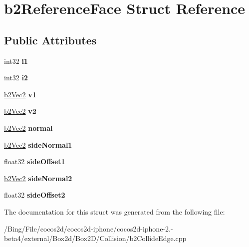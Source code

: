 \hypertarget{structb2_reference_face}{\section{b2\-Reference\-Face Struct Reference}
\label{structb2_reference_face}
}
\subsection*{Public Attributes}
\begin{DoxyCompactItemize}
\item 
\hypertarget{structb2_reference_face_a987d346858f5c1dd1de0dfddab779324}{int32 {\bfseries i1}}\label{structb2_reference_face_a987d346858f5c1dd1de0dfddab779324}

\item 
\hypertarget{structb2_reference_face_a838ab3e4a81b71cfaa450eb214584353}{int32 {\bfseries i2}}\label{structb2_reference_face_a838ab3e4a81b71cfaa450eb214584353}

\item 
\hypertarget{structb2_reference_face_a20165b58f2e81b78ed3a099ef85737ac}{\hyperlink{structb2_vec2}{b2\-Vec2} {\bfseries v1}}\label{structb2_reference_face_a20165b58f2e81b78ed3a099ef85737ac}

\item 
\hypertarget{structb2_reference_face_aa89eb5b51e9ee680b97c33041658f9ab}{\hyperlink{structb2_vec2}{b2\-Vec2} {\bfseries v2}}\label{structb2_reference_face_aa89eb5b51e9ee680b97c33041658f9ab}

\item 
\hypertarget{structb2_reference_face_a4ba73696920306d3c8fecc35a4433029}{\hyperlink{structb2_vec2}{b2\-Vec2} {\bfseries normal}}\label{structb2_reference_face_a4ba73696920306d3c8fecc35a4433029}

\item 
\hypertarget{structb2_reference_face_a478026ee3fa0d8d1349b01928eb9e947}{\hyperlink{structb2_vec2}{b2\-Vec2} {\bfseries side\-Normal1}}\label{structb2_reference_face_a478026ee3fa0d8d1349b01928eb9e947}

\item 
\hypertarget{structb2_reference_face_a7e2a902ed8f499fbb4305d51ce687876}{float32 {\bfseries side\-Offset1}}\label{structb2_reference_face_a7e2a902ed8f499fbb4305d51ce687876}

\item 
\hypertarget{structb2_reference_face_ad272f9369fbc1d28f60f77defd757dbd}{\hyperlink{structb2_vec2}{b2\-Vec2} {\bfseries side\-Normal2}}\label{structb2_reference_face_ad272f9369fbc1d28f60f77defd757dbd}

\item 
\hypertarget{structb2_reference_face_a7fa70d9f4bfc4cdf792408ffe204d017}{float32 {\bfseries side\-Offset2}}\label{structb2_reference_face_a7fa70d9f4bfc4cdf792408ffe204d017}

\end{DoxyCompactItemize}


The documentation for this struct was generated from the following file\-:\begin{DoxyCompactItemize}
\item 
/\-Bing/\-File/cocos2d/cocos2d-\/iphone/cocos2d-\/iphone-\/2.-\/beta4/external/\-Box2d/\-Box2\-D/\-Collision/b2\-Collide\-Edge.\-cpp\end{DoxyCompactItemize}
